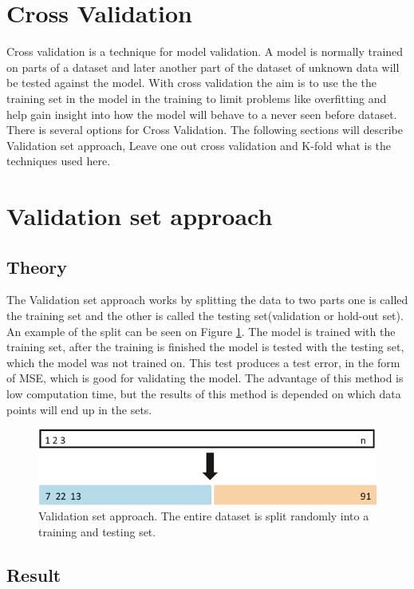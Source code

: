 \section{Cross Validation} \label{sc:crossValidation}
Cross validation is a technique for model validation. A model is normally trained on parts of a dataset and later another part of the dataset of unknown data will be tested against the model. With cross validation the aim is to use the the training set in the model in the training to limit problems like overfitting and help gain insight into how the model will behave to a never seen before dataset. There is several options for Cross Validation. The following sections will describe Validation set approach, Leave one out cross validation and K-fold what is the techniques used here.

\section{Validation set approach}
\subsection{Theory}
The Validation set approach works by splitting the data to two parts one is called the training set and the other is called the testing set(validation or hold-out set). An example of the split can be seen on Figure \ref{fig:validationsetapproach}. The model is trained with the training set, after the training is finished the model is tested with the testing set, which the model was not trained on. This test produces a test error, in the form of MSE, which is good for validating the model. The advantage of this method is low computation time, but the results of this method is depended on which data points will end up in the sets. 
\begin{figure}[H]
	\centering
	\includegraphics[width=0.4\linewidth]{crossValidation/validationSetApproach}
	\caption{Validation set approach. The entire dataset is split randomly into a training and testing set.}
	\label{fig:validationsetapproach}
\end{figure}

\subsection{Result}
